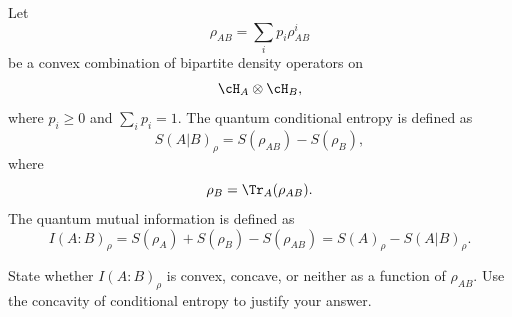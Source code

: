 Let
$$
\rho_{AB}
=
\sum_i p_i \rho_{AB}^i
$$
be a convex combination of bipartite density operators on
$$
\cH_A\otimes \cH_B,
$$
where $p_i\geq 0$ and $\sum_i p_i=1$. The quantum conditional entropy is defined as
$$
S(A|B)_\rho
=
S(\rho_{AB})-S(\rho_B),
$$
where
$$
\rho_B=\Tr_A(\rho_{AB}).
$$
The quantum mutual information is defined as
$$
I(A:B)_\rho
=
S(\rho_A)+S(\rho_B)-S(\rho_{AB})
=
S(A)_\rho-S(A|B)_\rho.
$$

State whether $I(A:B)_\rho$ is convex, concave, or neither as a function of $\rho_{AB}$. Use the concavity of conditional entropy to justify your answer.
